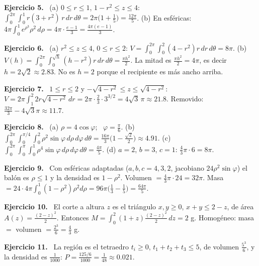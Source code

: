 \documentclass[11pt,a4paper]{article}
\newcommand{\sol}[1]{\par\medskip\noindent\textbf{Ejercicio #1.}\ }
\begin{document}
\sol{5}
(a) $0\le r\le1$, $1-r^2\le z\le4$: $\int_0^{2\pi}\int_0^1 r(3+r^2)\,r\,dr\,d\theta=2\pi\big(1+\frac15\big)=\frac{12\pi}5$.
(b) En esféricas: $4\pi\int_0^1e^{\rho^3}\rho^2\,d\rho=4\pi\cdot\frac{e-1}3=\frac{4\pi(e-1)}3$.

\sol{6}
(a) $r^2\le z\le4$, $0\le r\le2$: $V=\int_0^{2\pi}\int_0^2(4-r^2)r\,dr\,d\theta=8\pi$.
(b) $V(h)=\int_0^{2\pi}\int_0^{\sqrt h}(h-r^2)r\,dr\,d\theta=\frac{\pi h^2}2$. La mitad es $\frac{\pi h^2}2=4\pi$, es decir $h=2\sqrt2\approx2.83$. No es $h=2$ porque el recipiente es más ancho arriba.

\sol{7}
$1\le r\le2$ y $-\sqrt{4-r^2}\le z\le\sqrt{4-r^2}$: $V=2\pi\int_1^2 2r\sqrt{4-r^2}\,dr=2\pi\cdot\frac23\cdot3^{3/2}=4\sqrt3\,\pi\approx21.8$.
Removido: $\frac{32\pi}3-4\sqrt3\pi\approx11.7$.

\sol{8}
(a) $\rho=4\cos\varphi$; \ $\varphi=\frac\pi6$.
(b) $\int_0^{2\pi}\int_0^{\pi/4}\int_0^2\rho^2\sin\varphi\,d\rho\,d\varphi\,d\theta=\frac{16\pi}3\Big(1-\frac{\sqrt2}2\Big)\approx4.91$.
(c) $\int_0^{2\pi}\int_0^\pi\int_0^1\rho^4\sin\varphi\,d\rho\,d\varphi\,d\theta=\frac{4\pi}5$.
(d) $a=2$, $b=3$, $c=1$: $\frac43\pi\cdot6=8\pi$.

\sol{9}
Con esféricas adaptadas ($a,b,c=4,3,2$, jacobiano $24\rho^2\sin\varphi$) el balón es $\rho\le1$ y la densidad es $1-\rho^2$.
Volumen $=\frac43\pi\cdot24=32\pi$. Masa $=24\cdot4\pi\int_0^1(1-\rho^2)\rho^2d\rho=96\pi\Big(\frac13-\frac15\Big)=\frac{64\pi}5$.

\sol{10}
El corte a altura $z$ es el triángulo $x,y\ge0$, $x+y\le2-z$, de área $A(z)=\frac{(2-z)^2}2$. Entonces
$M=\int_0^2(1+z)\frac{(2-z)^2}2\,dz=2$ g. Homogéneo: masa $=$ volumen $=\frac{2^3}6=\frac43$ g.

\sol{11}
La región es el tetraedro $t_i\ge0$, $t_1+t_2+t_3\le5$, de volumen $\frac{5^3}6$, y la densidad es $\frac1{1000}$: $P=\frac{125/6}{1000}=\frac1{48}\approx0.021$.
\end{document}
